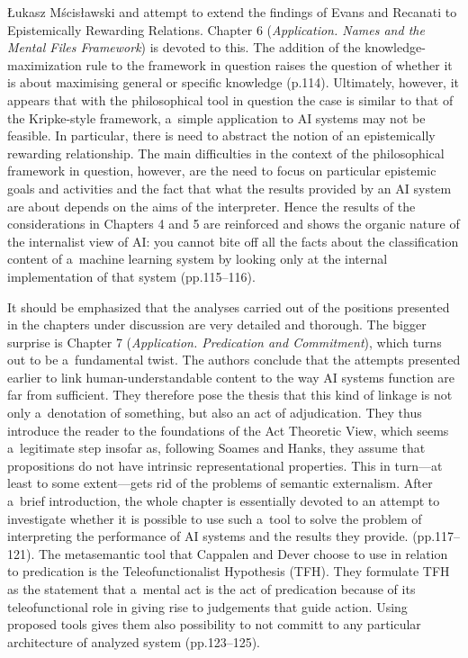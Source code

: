 \begin{newrevengenv}{Łukasz Mścisławski}
{} and attempt to extend the findings of Evans and Recanati to Epistemically Rewarding Relations. Chapter 6 (\textit{Application. Names and the Mental Files Framework}) is devoted to this. The addition of the knowledge-maximization rule to the framework in question raises the question of whether it is about maximising general or specific knowledge (p.114). Ultimately, however, it appears that with the philosophical tool in question the case is similar to that of the Kripke-style framework, a~simple application to AI systems may not be feasible. In particular, there is need to abstract the notion of an epistemically rewarding relationship. The main difficulties in the context of the philosophical framework in question, however, are the need to focus on particular epistemic goals and activities and the fact that what the results provided by an AI system are about depends on the aims of the interpreter. Hence the results of the considerations in Chapters 4 and 5 are reinforced and shows the organic nature of the internalist view of AI: you cannot bite off all the facts about the classification content of a~machine learning system by looking only at the internal implementation of that system (pp.115--116).

It should be emphasized that the analyses carried out of the positions presented in the chapters under discussion are very detailed and thorough. The bigger surprise is Chapter 7 (\textit{Application. Predication and Commitment}), which turns out to be a~fundamental twist. The authors conclude that the attempts presented earlier to link human-understandable content to the way AI systems function are far from sufficient. They therefore pose the thesis that this kind of linkage is not only a~denotation of something, but also an act of adjudication. They thus introduce the reader to the foundations of the Act Theoretic View, which seems a~legitimate step insofar as, following Soames and Hanks, they assume that propositions do not have intrinsic representational properties. This in turn---at least to some extent---gets rid of the problems of semantic externalism. After a~brief introduction, the whole chapter is essentially devoted to an attempt to investigate whether it is possible to use such a~tool to solve the problem of interpreting the performance of AI systems and the results they provide. (pp.117--121). The metasemantic tool that Cappalen and Dever choose to use in relation to predication is the Teleofunctionalist Hypothesis (TFH). They formulate TFH as the statement that a~mental act is the act of predication because of its teleofunctional role in giving rise to judgements that guide action. Using proposed tools gives them also possibility to not committ to any particular architecture of analyzed system (pp.123--125).


\end{newrevengenv}
